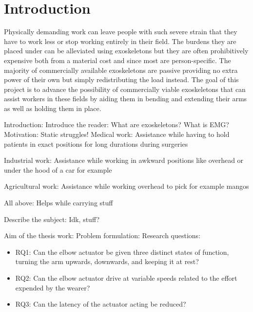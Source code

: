 \section{Introduction}
\label{section:intro}

Physically demanding work can leave people with such severe strain that they have to work less or stop working entirely in 
their field\cite{WorkDemands}. The burdens they are placed under can be alleviated using exoskeletons but they are often 
prohibitively expensive both from a material cost and since most are person-specific. The majority of commercially available 
exoskeletons are passive providing no extra power of their own but simply redistributing the load instead. The goal of this 
project is to advance the possibility of commercially viable exoskeletons that can assist workers in these fields by aiding 
them in bending and extending their arms as well as holding them in place.

Introduction:
    Introduce the reader: %
        What are exoskeletons?
        What is EMG?
    Motivation: %
        Static struggles!
            Medical work:
                Assistance while having to hold patients in exact positions for long durations during surgeries

            Industrial work:
                Assistance while working in awkward positions like overhead or under the hood of a car for example

            Agricultural work:
                Assistance while working overhead to pick for example mangos
            
            All above:
                Helps while carrying stuff

    Describe the subject: %
        Idk, stuff?

    Aim of the thesis work: %
        Problem formulation: %
            Research questions:
            \begin{itemize}
                 
                \item RQ1: Can the elbow actuator be given three distinct states of function, turning the arm upwards, downwards, and keeping it at rest?

                \item RQ2: Can the elbow actuator drive at variable speeds related to the effort expended by the wearer?

                \item RQ3: Can the latency of the actuator acting be reduced?

            \end{itemize}
            
